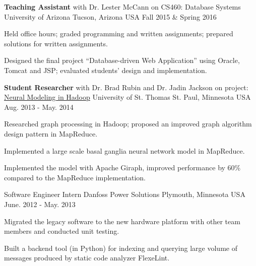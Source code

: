 \begin{cventries}
  \cventry
    {\textbf{Teaching Assistant} with Dr. Lester McCann
    on CS460: Database Systems}
    {University of Arizona} %
    {Tucson, Arizona USA} %
    {Fall 2015 \& Spring 2016} %
    {
      \begin{cvitems} %
        \item {Held office hours; graded programming and written
    assignments; prepared solutions for written assignments.}
        \item {Designed the final project ``Database-driven Web
    Application'' using Oracle, Tomcat and JSP; evaluated
    students' design and implementation.}
      \end{cvitems}
    }

  \cventry
    {\textbf{Student Researcher} with Dr. Brad Rubin and Dr. Jadin
    Jackson on project: \href{http://imsure.github.io/NeuralGiraph/}{Neural
    Modeling in Hadoop}}
    {University of St. Thomas} %
    {St. Paul, Minnesota USA} %
    {Aug. 2013 - May. 2014} %
    {
      \begin{cvitems} %
      \item {Researched graph processing in Hadoop; proposed an
    improved graph algorithm design pattern in MapReduce.}
      \item {Implemented a large scale basal ganglia neural network
    model in MapReduce.}
      \item {Implemented the model
       with Apache Giraph, improved
    performance by 60\% compared to the MapReduce implementation.}
      \end{cvitems}
    }

  \cventry
    {Software Engineer Intern} %
    {Danfoss Power Solutions} %
    {Plymouth, Minnesota USA} %
    {June. 2012 - May. 2013} %
    {
      \begin{cvitems} %
        \item {Migrated the legacy software to the new hardware
    platform with other team members and conducted unit testing.}
       \item {Built a backend tool (in Python) for indexing and
    querying large volume of messages produced by static code analyzer FlexeLint.}
      \end{cvitems}
    }


\end{cventries}
